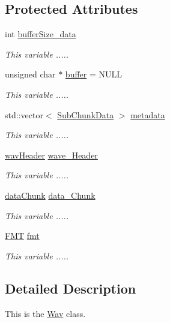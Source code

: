 \subsection*{Protected Attributes}
\begin{DoxyCompactItemize}
\item 
int \hyperlink{classWav_aaa1fc130f301f39cc74091dfb9750d13}{buffer\+Size\+\_\+data}
\begin{DoxyCompactList}\small\item\em This variable ..... \end{DoxyCompactList}\item 
unsigned char $\ast$ \hyperlink{classWav_ae1ba9e10151e9d104c150f6cc5512199}{buffer} = N\+U\+LL
\begin{DoxyCompactList}\small\item\em This variable ..... \end{DoxyCompactList}\item 
std\+::vector$<$ \hyperlink{structSubChunkData}{Sub\+Chunk\+Data} $>$ \hyperlink{classWav_ae6078b0bc65f5bcf4c2b7e3e7b4cf8bf}{metadata}
\begin{DoxyCompactList}\small\item\em This variable ..... \end{DoxyCompactList}\item 
\hyperlink{structwavHeader}{wav\+Header} \hyperlink{classWav_a3d95345a678bba0772e48325306ecda1}{wave\+\_\+\+Header}
\begin{DoxyCompactList}\small\item\em This variable ..... \end{DoxyCompactList}\item 
\hyperlink{structdataChunk}{data\+Chunk} \hyperlink{classWav_ad56011c7baf92b85b81483d7ef8b58ef}{data\+\_\+\+Chunk}
\begin{DoxyCompactList}\small\item\em This variable ..... \end{DoxyCompactList}\item 
\hyperlink{structFMT}{F\+MT} \hyperlink{classWav_a2d8b662300b2821186951e428da6a6a9}{fmt}
\begin{DoxyCompactList}\small\item\em This variable ..... \end{DoxyCompactList}\end{DoxyCompactItemize}


\subsection{Detailed Description}
This is the \hyperlink{classWav}{Wav} class. 

